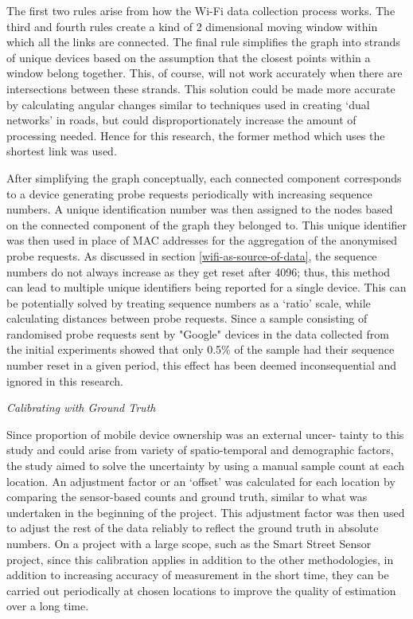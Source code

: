 The first two rules arise from how the Wi-Fi data collection process works.
The third and fourth rules create a kind of 2 dimensional moving window within which all the links are connected.
The final rule simplifies the graph into strands of unique devices based on the assumption that the closest points within a window belong together.
This, of course, will not work accurately when there are intersections between these strands.
This solution could be made more accurate by calculating angular changes similar to techniques used in creating ‘dual networks’ in roads\cite{masucci2014}, but could disproportionately increase the amount of processing needed.
Hence for this research, the former method which uses the shortest link was used.

After simplifying the graph conceptually, each connected component corresponds to a device generating probe requests periodically with increasing sequence numbers.
 A unique identification number was then assigned to the nodes based on the connected component of the graph they belonged to.
This unique identifier was then used in place of MAC addresses for the aggregation of the anonymised probe requests.
As discussed in section \ref{wifi-as-source-of-data}, the sequence numbers do not always increase as they get reset after 4096; thus, this method can lead  to multiple unique identifiers being reported for a single device.
This can be potentially solved by treating sequence numbers as a ‘ratio’ scale, while calculating distances between probe requests.
Since a sample consisting of randomised probe requests sent by "Google" devices in the data collected from the initial experiments showed that only 0.5\% of the sample had their sequence number reset in a given period, this effect has been deemed inconsequential and ignored in this research.

\vspace{1.5em}\noindent\textit{Calibrating with Ground Truth}\vspace{0.5em}

Since proportion of mobile device ownership was an external uncer- tainty to this study and could arise from variety of spatio-temporal and demographic factors, the study aimed to solve the uncertainty by using a manual sample count at each location.
An adjustment factor or an ‘offset’ was calculated for each location by comparing the sensor-based counts and ground truth, similar to what was undertaken in the beginning of the project.
This adjustment factor was then used to adjust the rest of the data reliably to reflect the ground truth in absolute numbers.
On a project with a large scope, such as the Smart Street Sensor project, since this calibration applies in addition to the other methodologies, in addition to increasing accuracy of measurement in the short time, they can be carried out periodically at chosen locations to improve the quality of estimation over a long time.

